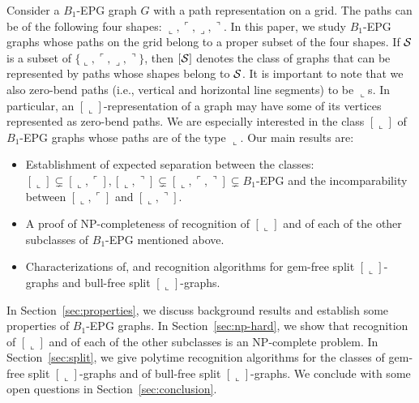 \documentclass[11pt,3p,times]{elsarticle}
\newcommand{\La}{\ensuremath{\llcorner}} \newcommand{\Lb}{\ensuremath{\ulcorner}} \newcommand{\Lc}{\ensuremath{\lrcorner}} \newcommand{\Ld}{\ensuremath{\urcorner}}
\begin{document}
Consider a $B_1$-EPG graph $G$ with a path representation on a grid.
The paths can be of the following four shapes: $\La, \Lb, \Lc,
\Ld$. In this paper, we  study  $B_1$-EPG graphs whose paths on
the grid belong to a proper subset of the four shapes.   
If ${\cal S}$
is  a subset of $\{\La, \Lb, \Lc, \Ld\}$, then $[{\cal S}]$
denotes the class of graphs that can be represented by paths whose
shapes belong to ${\cal S}$. It is important to note that we also 
zero-bend paths (i.e., vertical and horizontal line segments) to be $\La$s. 
In particular, an $[\La]$-representation of a graph may have some of its vertices represented as zero-bend paths. 
We are especially interested in the class
$[\La]$ of $B_1$-EPG graphs whose paths are of the type $\La$. Our
main results are:
\begin{itemize}
 \item Establishment of expected separation between the classes: $[\La] \subsetneq
[\La,\Lb],[\La,\Ld] \subsetneq [\La,\Lb,\Ld] \subsetneq B_1$-EPG
and the incomparability between $[\La,\Lb]$ and $[\La,\Ld]$.
 \item A proof of NP-completeness of recognition of $[\La]$ and
 of each of the other subclasses of $B_1$-EPG mentioned above.
 \item Characterizations of, and recognition algorithms for
 gem-free split $[\La]$-graphs and bull-free split $[\La]$-graphs.
\end{itemize}
In Section~\ref{sec:properties}, we discuss background results and
establish some properties of $B_1$-EPG graphs. In
Section~\ref{sec:np-hard}, we show that recognition of $[\La]$
and of each of the other subclasses is
an NP-complete problem. In Section~\ref{sec:split}, we give
polytime recognition algorithms for the classes of
gem-free split $[\La]$-graphs and of bull-free split $[\La]$-graphs. We
conclude with some open questions in Section~\ref{sec:conclusion}.
\end{document}
